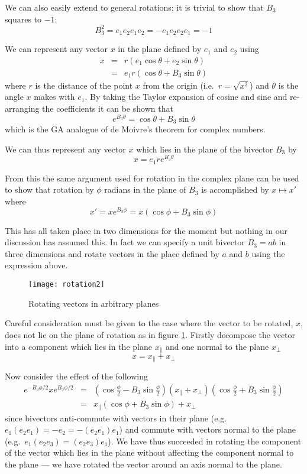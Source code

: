 We can also easily extend to general rotations; it is trivial to
show that $B_3$ squares to $-1$:
\begin{displaymath}
B_3^2 = e_1e_2e_1e_2 = -e_1e_2e_2e_1 = -1
\end{displaymath}

We can represent any vector $x$ in the plane defined by $e_1$ and
$e_2$ using
\begin{eqnarray*}
x & = & r ( e_1 \cos \theta + e_2 \sin \theta) \\
  & = & e_1 r ( \cos \theta + B_3 \sin \theta)
\end{eqnarray*}
where $r$ is the distance of the point $x$ from the origin (i.e.\ $r = \sqrt{x^2}$)
and $\theta$ is the angle $x$ makes with $e_1$. 
By taking the Taylor expansion of cosine
and sine and re-arranging the coefficients it can be shown that
\[
e^{B_3\theta} = \cos \theta + B_3 \sin \theta
\]
which is the GA analogue of de Moivre's theorem for complex
numbers.

We can thus represent any vector $x$ which lies in the plane of the
bivector $B_3$ by
\[
x=e_1re^{B_3\theta}
\]

From this the same argument used for rotation in the complex plane 
can be used to show that rotation by
$\phi$ radians in the plane of $B_3$ is accomplished by $x \mapsto x'$
where
\begin{displaymath}
x' = xe^{B_3\phi} = x (\cos \phi + B_3 \sin \phi)
\end{displaymath}

This has all taken place in two dimensions for the moment but nothing in our
discussion has assumed this. In fact we can specify a unit bivector $B_3 = ab$ in
three dimensions and rotate vectors in the place defined by $a$ and $b$ using
the expression above.

\begin{figure}
\centering
\texttt{[image: rotation2]}
\caption{Rotating vectors in arbitrary planes\label{fig:rotation2}}
\end{figure}

Careful consideration must be given to the case where the vector to be
rotated, $x$, does not lie on the plane of rotation as in figure
\ref{fig:rotation2}. Firstly decompose the
vector into a component which lies in the plane $x_\parallel$ and one
normal to the plane $x_\perp$
\[
x = x_\parallel + x_\perp
\]

Now consider the effect of the following
\begin{eqnarray*}
e^{-B_3\phi/2}
x
e^{B_3\phi/2}
& = & \left(\cos \frac{\phi}{2} - B_3 \sin \frac{\phi}{2}\right)
(x_\parallel + x_\perp )
\left(\cos \frac{\phi}{2} + B_3 \sin \frac{\phi}{2}\right) \\
& = & x_\parallel (\cos \phi + B_3 \sin \phi) + x_\perp
\end{eqnarray*}
since bivectors anti-commute with vectors in their plane (e.g. 
$e_1(e_2e_1) = -e_2 = -(e_2e_1)e_1$) and commute with
vectors normal to the plane (e.g.\ $e_1(e_2e_3) = (e_2e_3)e_1$).
We have thus succeeded in rotating the component of the vector 
which lies in the plane without affecting the component normal
to the plane --- we have rotated the vector around an axis normal to
the plane.

